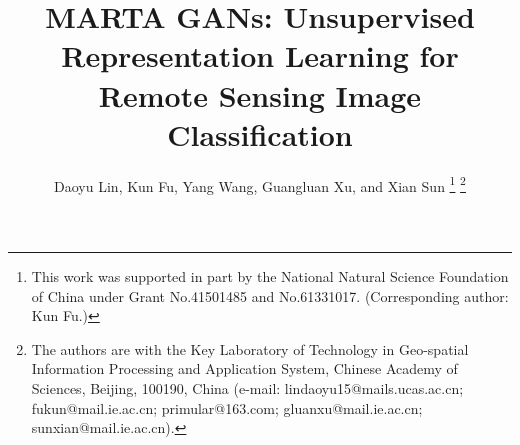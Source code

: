 \documentclass[journal]{IEEEtran}
\begin{document}
%
\title{MARTA GANs: Unsupervised Representation Learning for
	Remote Sensing Image Classification}
%
%
%

\author{
	Daoyu Lin, Kun Fu, Yang Wang, Guangluan Xu, and Xian Sun 
	\thanks{This work was supported in part by the National Natural Science Foundation of China under Grant No.41501485 and No.61331017. (Corresponding author: Kun Fu.)}
	\thanks{The authors are with the Key Laboratory of Technology in Geo-spatial
	Information Processing and Application System, Chinese Academy of Sciences, Beijing, 100190, China (e-mail: lindaoyu15@mails.ucas.ac.cn; fukun@mail.ie.ac.cn; primular@163.com; gluanxu@mail.ie.ac.cn; sunxian@mail.ie.ac.cn).}

	
	

}



% 
\end{document}
